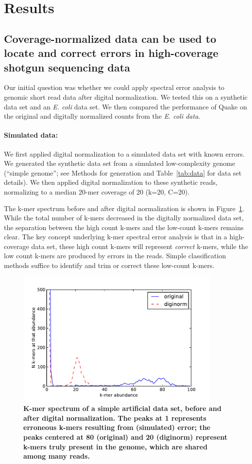 \documentclass{article}
\begin{document}
\section{Results}

\subsection{Coverage-normalized data can be used to locate
and correct errors in high-coverage shotgun sequencing data}

Our initial question was whether we could apply spectral error analysis
to genomic short read data after digital normalization.  We
tested this on a synthetic data set and an {\em E. coli} data set.  We
then compared the performance of Quake on the original and digitally
normalized counts from the {\em E. coli data}.

\paragraph{Simulated data:}
We first applied digital normalization to a simulated data set with
known errors.  We generated the synthetic data set from a simulated
low-complexity genome (``simple genome''; see Methods for generation
and Table~\ref{tab:data} for data set details). We then applied
digital normalization to these synthetic reads, normalizing to a
median 20-mer coverage of 20 (k=20, C=20).

The k-mer spectrum before and after digital normalization is shown in
Figure~\ref{fig:spectrum}.  While the total number of k-mers decreased
in the digitally normalized data set, the separation between the high
count k-mers and the low-count k-mers remains clear.  The key concept
underlying k-mer spectral error analysis is that in a high-coverage
data set, these high count k-mers will represent {\em correct} k-mers,
while the low count k-mers are produced by errors in the reads.
Simple classification methods suffice to identify and trim or correct
these low-count k-mers.

\begin{figure}[!ht]
 \centerline{\includegraphics[width=4in]{./figures/kmer-spectrum}}
\caption{\bf K-mer spectrum of a simple artificial data set, before
  and after digital normalization.  The peaks at 1 represents
  erroneous k-mers resulting from (simulated) error; the peaks
  centered at 80 (original) and 20 (diginorm) represent k-mers truly
  present in the genome, which are shared among many reads.}
\label{fig:spectrum}
\end{figure}
\end{document}
